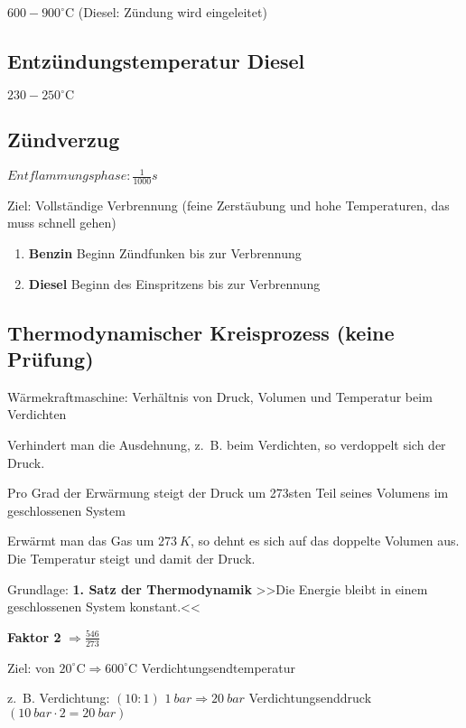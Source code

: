 $600 - 900^\circ\text{C}$ (Diesel: Zündung wird eingeleitet)

\subsection{Entzündungstemperatur
Diesel}\label{entzuendungstemperatur-diesel}

$230 - 250^\circ\text{C}$

\subsection{Zündverzug}\label{zuendverzug}

$Entflammungsphase: \frac{1}{1000} s$

Ziel: Vollständige Verbrennung (feine Zerstäubung und hohe Temperaturen,
das muss schnell gehen)

\begin{enumerate}
\def\labelenumi{(\arabic{enumi})}
\item
  \textbf{Benzin} Beginn Zündfunken bis zur Verbrennung
\item
  \textbf{Diesel} Beginn des Einspritzens bis zur Verbrennung
\end{enumerate}

\subsection{Thermodynamischer Kreisprozess (keine
Prüfung)}\label{thermodynamischer-kreisprozess-keine-pruefung}

Wärmekraftmaschine: Verhältnis von Druck, Volumen und Temperatur beim
Verdichten

Verhindert man die Ausdehnung, z.~B. beim Verdichten, so verdoppelt sich
der Druck.

Pro Grad der Erwärmung steigt der Druck um 273sten Teil seines Volumens
im geschlossenen System

Erwärmt man das Gas um $273~K$, so dehnt es sich auf das doppelte
Volumen aus. Die Temperatur steigt und damit der Druck.

Grundlage: \textbf{1. Satz der Thermodynamik} >>Die Energie bleibt in
einem geschlossenen System konstant.<<

\textbf{Faktor 2} $\Rightarrow \frac{546}{273}$

Ziel: von $20^\circ\text{C} \Rightarrow 600^\circ\text{C}$
Verdichtungsendtemperatur

z.~B. Verdichtung: $(10:1)$ $1~bar \Rightarrow 20~bar$
Verdichtungsenddruck $(10~bar \cdot 2 = 20~bar)$

